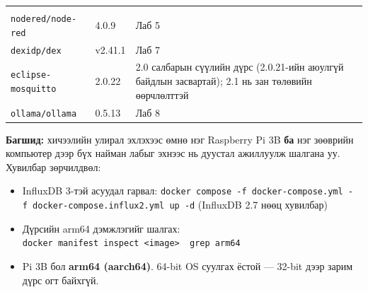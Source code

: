\begin{longtable}[]{@{}lll@{}}
\begin{minipage}[t]{0.30\columnwidth}
\end{minipage}\tabularnewline
\begin{minipage}[t]{0.30\columnwidth}\raggedright
\texttt{nodered/node-red}\strut
\end{minipage} & \begin{minipage}[t]{0.30\columnwidth}\raggedright
4.0.9\strut
\end{minipage} & \begin{minipage}[t]{0.30\columnwidth}\raggedright
Лаб 5\strut
\end{minipage}\tabularnewline
\begin{minipage}[t]{0.30\columnwidth}\raggedright
\texttt{dexidp/dex}\strut
\end{minipage} & \begin{minipage}[t]{0.30\columnwidth}\raggedright
v2.41.1\strut
\end{minipage} & \begin{minipage}[t]{0.30\columnwidth}\raggedright
Лаб 7\strut
\end{minipage}\tabularnewline
\begin{minipage}[t]{0.30\columnwidth}\raggedright
\texttt{eclipse-mosquitto}\strut
\end{minipage} & \begin{minipage}[t]{0.30\columnwidth}\raggedright
2.0.22\strut
\end{minipage} & \begin{minipage}[t]{0.30\columnwidth}\raggedright
2.0 салбарын сүүлийн дүрс (2.0.21-ийн аюулгүй байдлын засвартай); 2.1 нь зан төлөвийн өөрчлөлттэй\strut
\end{minipage}\tabularnewline
\begin{minipage}[t]{0.30\columnwidth}\raggedright
\texttt{ollama/ollama}\strut
\end{minipage} & \begin{minipage}[t]{0.30\columnwidth}\raggedright
0.5.13\strut
\end{minipage} & \begin{minipage}[t]{0.30\columnwidth}\raggedright
Лаб 8\strut
\end{minipage}\tabularnewline
\bottomrule
\end{longtable}\endgroup

\textbf{Багшид:} хичээлийн улирал эхлэхээс өмнө нэг Raspberry Pi 3B \textbf{ба} нэг зөөврийн компьютер дээр бүх найман лабыг эхнээс нь дуустал ажиллуулж шалгана уу. Хувилбар зөрчилдвөл:

\begin{itemize}
\tightlist
\item
  InfluxDB 3-тэй асуудал гарвал: \texttt{docker\ compose\ -f\ docker-compose.\allowbreak{}yml\ -f\ docker-compose.\allowbreak{}influx2.\allowbreak{}yml\ up\ -d} (InfluxDB 2.7 нөөц хувилбар)
\item
  Дүрсийн arm64 дэмжлэгийг шалгах: \texttt{docker\ manifest\ inspect\ \textless{}image\textgreater{}\ \textbar{}\ grep\ arm64}
\item
  Pi 3B бол \textbf{arm64 (aarch64)}. 64-bit OS суулгах ёстой --- 32-bit дээр зарим дүрс огт байхгүй.
\end{itemize}

